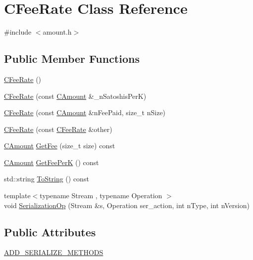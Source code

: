 \hypertarget{class_c_fee_rate}{}\section{C\+Fee\+Rate Class Reference}
\label{class_c_fee_rate}


{\ttfamily \#include $<$amount.\+h$>$}

\subsection*{Public Member Functions}
\begin{DoxyCompactItemize}
\item 
\hyperlink{class_c_fee_rate_aed181aa12213c646c8a4632280444412}{C\+Fee\+Rate} ()
\item 
\hyperlink{class_c_fee_rate_abee4364fc0d83612feda7c9f5425a7cc}{C\+Fee\+Rate} (const \hyperlink{amount_8h_a4eaf3a5239714d8c45b851527f7cb564}{C\+Amount} \&\+\_\+n\+Satoshis\+Per\+K)
\item 
\hyperlink{class_c_fee_rate_ad92ea084b8fa9495cbfe0da9cfd1cd69}{C\+Fee\+Rate} (const \hyperlink{amount_8h_a4eaf3a5239714d8c45b851527f7cb564}{C\+Amount} \&n\+Fee\+Paid, size\+\_\+t n\+Size)
\item 
\hyperlink{class_c_fee_rate_aa82ca8ba290a1c02ed522aacfb5105ef}{C\+Fee\+Rate} (const \hyperlink{class_c_fee_rate}{C\+Fee\+Rate} \&other)
\item 
\hyperlink{amount_8h_a4eaf3a5239714d8c45b851527f7cb564}{C\+Amount} \hyperlink{class_c_fee_rate_a11d1c2c0c9e5601d82fecd023358bcc2}{Get\+Fee} (size\+\_\+t size) const 
\item 
\hyperlink{amount_8h_a4eaf3a5239714d8c45b851527f7cb564}{C\+Amount} \hyperlink{class_c_fee_rate_a5cf990404e896b332cf6fb836244b4a6}{Get\+Fee\+Per\+K} () const 
\item 
std\+::string \hyperlink{class_c_fee_rate_ab517bd05a9b78fbd02aabe7d74d7049f}{To\+String} () const 
\item 
{\footnotesize template$<$typename Stream , typename Operation $>$ }\\void \hyperlink{class_c_fee_rate_aface850a2c1af316cedf87d24f04fda3}{Serialization\+Op} (Stream \&s, Operation ser\+\_\+action, int n\+Type, int n\+Version)
\end{DoxyCompactItemize}
\subsection*{Public Attributes}
\begin{DoxyCompactItemize}
\item 
\hyperlink{class_c_fee_rate_ab1030f8a059eb5ccade1e3803bd727b3}{A\+D\+D\+\_\+\+S\+E\+R\+I\+A\+L\+I\+Z\+E\+\_\+\+M\+E\+T\+H\+O\+D\+S}
\end{DoxyCompactItemize}
